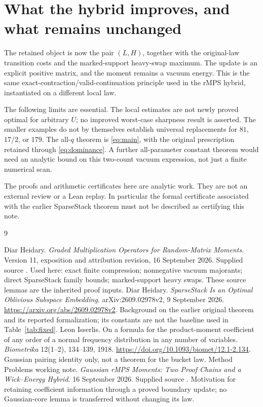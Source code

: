 \documentclass[11pt]{article}
\numberwithin{equation}{section}
\theoremstyle{definition}\newtheorem{definition}[theorem]{Definition}
\theoremstyle{remark}\newtheorem{remark}[theorem]{Remark}
\begin{document}
\section{What the hybrid improves, and what remains unchanged}
The retained object is now the pair $(L,H)$, together with the original-law transition costs and the marked-support heavy-swap maximum. The update is an explicit positive matrix, and the moment remains a vacuum energy. This is the same exact-contraction/valid-continuation principle used in the rMPS hybrid, instantiated on a different local law.

The following limits are essential. The local estimates are not newly proved optimal for arbitrary $U$; no improved worst-case sharpness result is asserted. The smaller examples do not by themselves establish universal replacements for $81$, $17/2$, or $179$. The all-$q$ theorem is \eqref{eq:main}, with the original prescription retained through \eqref{eq:dominance}. A further all-parameter constant theorem would need an analytic bound on this two-count vacuum expression, not just a finite numerical scan.

The proofs and arithmetic certificates here are analytic work. They are not an external review or a Lean replay. In particular the formal certificate associated with the earlier SparseStack theorem must not be described as certifying this note.

\clearpage
\begin{thebibliography}{9}\raggedright
{} Diar Heidary. \emph{Graded Multiplication Operators for Random-Matrix Moments}. Version 11, exposition and attribution revision, 16 September 2026. Supplied source . Used here: exact finite compression; nonnegative vacuum majorants; direct SparseStack family bounds; marked-support heavy swaps. These source lemmas are the inherited proof inputs.
 Diar Heidary. \emph{SparseStack Is an Optimal Oblivious Subspace Embedding}. arXiv:2609.02978v2, 9 September 2026. \url{https://arxiv.org/abs/2609.02978v2}. Background on the earlier original theorem and its reported formalization; its constants are not the baseline used in Table~\ref{tab:fixed}.
 Leon Isserlis. On a formula for the product-moment coefficient of any order of a normal frequency distribution in any number of variables. \emph{Biometrika} 12(1--2), 134--139, 1918. \url{https://doi.org/10.1093/biomet/12.1-2.134}. Gaussian pairing identity only, not a theorem for the bucket law.
 Method Problems working note. \emph{Gaussian rMPS Moments: Two Proof Chains and a Wick--Energy Hybrid}. 16 September 2026. Supplied source . Motivation for retaining coefficient information through a proved boundary update; no Gaussian-core lemma is transferred without changing its law.
\end{thebibliography}
\end{document}
